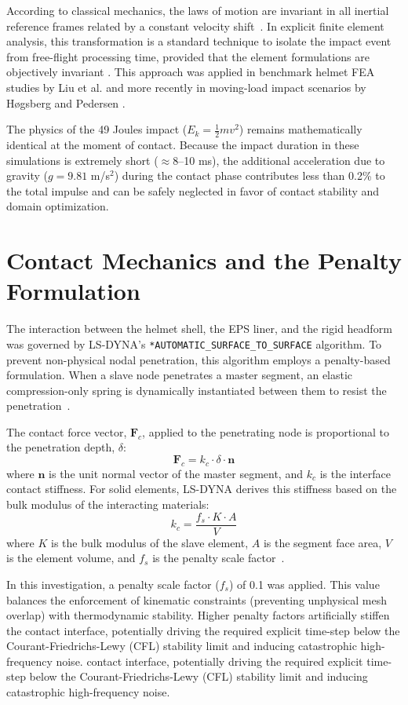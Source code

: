 According to classical mechanics, the laws of motion are invariant in all 
inertial reference frames related by a constant velocity shift~\cite{goldstein2002}. 
In explicit finite element analysis, this transformation is a standard 
technique to isolate the impact event from free-flight processing time, 
provided that the element formulations are objectively invariant 
\cite{lsdyna2021, belytschko2013}. This approach was applied 
in benchmark helmet FEA studies by Liu et al. \cite{liu2003} and 
more recently in moving-load impact scenarios by Høgsberg and Pedersen 
\cite{hogsberg2017}. 

The physics of the 49 Joules impact ($E_k = \frac{1}{2}mv^2$) remains 
mathematically identical at the moment of contact. Because the 
impact duration in these simulations is extremely short ($\approx 8$--10 ms), 
the additional acceleration due to gravity ($g = 9.81$ m/s$^2$) during the 
contact phase contributes less than 0.2\% to the total impulse and can be 
safely neglected in favor of contact stability and domain optimization.

\section{Contact Mechanics and the Penalty Formulation}
The interaction between the helmet shell, the EPS liner, and the rigid headform was governed by LS-DYNA's \texttt{*AUTOMATIC\_SURFACE\_TO\_SURFACE} algorithm. To prevent non-physical nodal penetration, this algorithm employs a penalty-based formulation. When a slave node penetrates a master segment, an elastic compression-only spring is dynamically instantiated between them to resist the penetration~\cite{belytschko1992}.

The contact force vector, $\mathbf{F}_c$, applied to the penetrating node is proportional to the penetration depth, $\delta$:
\begin{equation}
    \mathbf{F}_c = k_c \cdot \delta \cdot \mathbf{n}
\end{equation}
where $\mathbf{n}$ is the unit normal vector of the master segment, and $k_c$ is the interface contact stiffness. For solid elements, LS-DYNA derives this stiffness based on the bulk modulus of the interacting materials:
\begin{equation}
    k_c = \frac{f_s \cdot K \cdot A}{V}
\end{equation}
where $K$ is the bulk modulus of the slave element, $A$ is the segment face area, $V$ is the element volume, and $f_s$ is the penalty scale factor~\cite{lsdyna_theory}. 

In this investigation, a penalty scale factor ($f_s$) of 0.1 was applied. This value balances the enforcement of kinematic constraints (preventing unphysical mesh overlap) with thermodynamic stability. Higher penalty factors artificially stiffen the contact interface, potentially driving the required explicit time-step below the Courant-Friedrichs-Lewy (CFL) stability limit and inducing catastrophic high-frequency noise.
contact interface, potentially driving the required explicit time-step below the Courant-Friedrichs-Lewy (CFL) stability limit and inducing catastrophic high-frequency noise.
